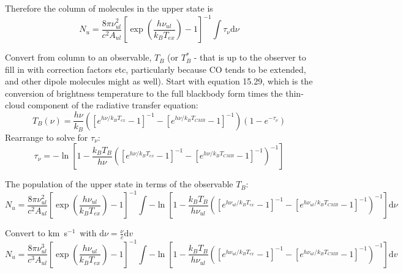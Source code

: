 \documentclass[preprint]{aastex}
\newcommand{\dv}{\ensuremath{\textrm{d}v}}
\newcommand{\dnu}{\ensuremath{\textrm{d}\nu}}
\newcommand{\kms}{\textrm{km~s}\ensuremath{^{-1}}}	%
\begin{document}
Therefore the column of molecules in the upper state is
\begin{equation}
  N_u = \frac{8\pi \nu_{ul}^2}{c^2 A_{ul}} \left[\exp\left(\frac{h \nu_{ul} }{k_B T_{ex}}\right) - 1 \right]^{-1} \int \tau_\nu \dnu
\end{equation}

Convert from column to an observable, $T_B$ (or $T_B^*$ - that is up to the observer to fill in with correction factors etc, particularly
because CO tends to be extended, and other dipole molecules might as well).  Start with \citet{rohlfs} equation 15.29, which is the
conversion of brightness temperature to the full blackbody form times the thin-cloud component of the radiative transfer equation:
\begin{equation} 
  \label{eqn:tbrightnesscmb}
  T_B(\nu) = \frac{h \nu}{k_B} \left(\left[e^{h \nu / k_B T_{ex}} - 1\right]^{-1} - \left[e^{h \nu / k_B T_{CMB}} - 1\right]^{-1} \right) (1-e^{-\tau_\nu})
\end{equation}
Rearrange to solve for $\tau_\nu$:
\begin{equation}
  \tau_\nu = -\ln\left[ 1 - \frac{k_B T_B}{h \nu} \left(\left[e^{h \nu / k_B T_{ex}} - 1\right]^{-1} - \left[e^{h \nu / k_B T_{CMB}} - 1\right]^{-1} \right)^{-1} \right]
\end{equation}

The population of the upper state in terms of the observable $T_B$:
\begin{equation}
  N_u = \frac{8\pi \nu_{ul}^2}{c^2 A_{ul}} \left[\exp\left(\frac{h \nu_{ul} }{k_B T_{ex}}\right) - 1 \right]^{-1} \int -\ln\left[ 1 - \frac{k_B T_B}{h \nu_{ul}} \left(\left[e^{h \nu_{ul} / k_B T_{ex}} - 1\right]^{-1} - \left[e^{h \nu_{ul} / k_B T_{CMB}} - 1\right]^{-1} \right)^{-1} \right] \dnu
\end{equation}

Convert to \kms\ with $\dnu = \frac{\nu}{c} \dv$
\begin{equation}
  \label{eqn:nuppernoapprox}
  N_u = \frac{8\pi \nu_{ul}^3}{c^3 A_{ul}} \left[\exp\left(\frac{h \nu_{ul} }{k_B T_{ex}}\right) - 1 \right]^{-1} \int -\ln\left[ 1 - \frac{k_B T_B}{h \nu_{ul}} \left(\left[e^{h \nu_{ul} / k_B T_{ex}} - 1\right]^{-1} - \left[e^{h \nu_{ul} / k_B T_{CMB}} - 1\right]^{-1} \right)^{-1} \right] \dv
\end{equation}
\end{document}
